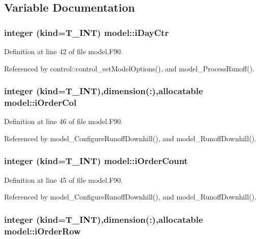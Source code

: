 \subsection{Variable Documentation}
\hypertarget{namespacemodel_a86a9f30f454de7137945c61f3d8a7a8a}{
\subsubsection[{iDayCtr}]{\setlength{\rightskip}{0pt plus 5cm}integer (kind=T\_\-INT) {\bf model::iDayCtr}}}
\label{namespacemodel_a86a9f30f454de7137945c61f3d8a7a8a}


Definition at line 42 of file model.F90.



Referenced by control::control\_\-setModelOptions(), and model\_\-ProcessRunoff().

\hypertarget{namespacemodel_ab88058fb18ed4c3a4d26f357e8c4d44d}{
\subsubsection[{iOrderCol}]{\setlength{\rightskip}{0pt plus 5cm}integer (kind=T\_\-INT),dimension(:),allocatable {\bf model::iOrderCol}}}
\label{namespacemodel_ab88058fb18ed4c3a4d26f357e8c4d44d}


Definition at line 46 of file model.F90.



Referenced by model\_\-ConfigureRunoffDownhill(), and model\_\-RunoffDownhill().

\hypertarget{namespacemodel_a6427b836cffd85fb90dd0557e564b4d7}{
\subsubsection[{iOrderCount}]{\setlength{\rightskip}{0pt plus 5cm}integer (kind=T\_\-INT) {\bf model::iOrderCount}}}
\label{namespacemodel_a6427b836cffd85fb90dd0557e564b4d7}


Definition at line 45 of file model.F90.



Referenced by model\_\-ConfigureRunoffDownhill(), and model\_\-RunoffDownhill().

\hypertarget{namespacemodel_ae02f87fcf1fa7cfc9b55189633ae7f47}{
\subsubsection[{iOrderRow}]{\setlength{\rightskip}{0pt plus 5cm}integer (kind=T\_\-INT),dimension(:),allocatable {\bf model::iOrderRow}}}
\label{namespacemodel_ae02f87fcf1fa7cfc9b55189633ae7f47}


